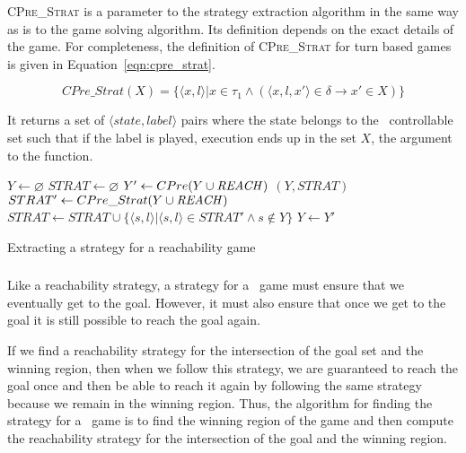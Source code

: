 \textsc{CPre\_Strat} is a parameter to the strategy extraction algorithm in the same way as \textsc{\cpre} is to the game solving algorithm. Its definition depends on the exact details of the game. For completeness, the definition of \textsc{CPre\_Strat} for turn based games is given in Equation~\ref{eqn:cpre_strat}. 

\begin{equation}
    CPre\_Strat(X) = \{\langle x, l \rangle | x \in \tau_1 \wedge (\langle x, l, x' \rangle \in \delta \rightarrow x' \in X)\}
    \label{eqn:cpre_strat}
\end{equation}

It returns a set of $\langle state, label \rangle$ pairs where the state belongs to the \pone\ controllable set such that if the label is played, execution ends up in the set $X$, the argument to the function.

\begin{algorithm}[t]
    \begin{algorithmic}[1]

\State $Y \gets \varnothing$ \label{l:rs:init}
\State $STRAT \gets \varnothing$
    \Loop
        \State $Y' \gets CPre(Y \cup \mathit{REACH})$
            \State\Return $(Y, STRAT)$
        \EndIf
        \State $STRAT' \gets CPre\_Strat(Y \cup \mathit{REACH})$ \label{l:rs:cs}
        \State $STRAT \gets STRAT \cup \{\langle s, l \rangle | \langle s, l \rangle \in STRAT' \wedge s \notin Y\}$  \label{l:rs:as}
        \State $Y \gets Y'$
    \EndLoop
\EndFunction

\end{algorithmic}
\caption{Extracting a strategy for a reachability game}
\label{alg:reach_strat}
\end{algorithm}

\subsubsection{\buchi}

Like a reachability strategy, a strategy for a \buchi\ game must ensure that we eventually get to the goal. However, it must also ensure that once we get to the goal it is still possible to reach the goal again. 

If we find a reachability strategy for the intersection of the goal set and the winning region, then when we follow this strategy, we are guaranteed to reach the goal once and then be able to reach it again by following the same strategy because we remain in the winning region. Thus, the algorithm for finding the strategy for a \buchi\ game is to find the winning region of the game and then compute the reachability strategy for the intersection of the goal and the winning region.

